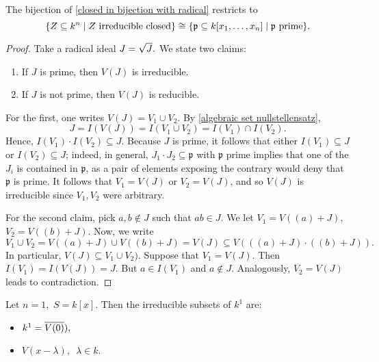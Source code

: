 \begin{prop}
  \label{prime irreducible}
  The bijection of \cref{closed in bijection with radical} restricts to
  \[\{Z \subseteq k^n \mathrel{|} \text{$Z$ irreducible closed}\} \cong \{\mathfrak p \subseteq k[x_1, \dotsc, x_n] \mathrel{|} \text{$\mathfrak p $ prime}\}.\]
\end{prop}
\begin{proof}
  Take a radical ideal \(J = \sqrt{J}.\) We state two claims:
  \begin{enumerate}
  \item If \(J\) is prime, then \(V(J)\) is irreducible.
  \item If \(J\) is not prime, then \(V(J)\) is reducible.
  \end{enumerate}
  For the first, one writes \(V(J) = V_1 \cup V_2.\) By \cref{algebraic set nullstellensatz},
  \[J = I(V(J)) = I(V_1 \cup V_2) = I(V_1) \cap I(V_2).\]
  Hence,
  \(I(V_1) \cdot I(V_2) \subseteq J.\)
  Because \(J\) is prime, it follows that either \(I(V_1) \subseteq J\) or \(I(V_2) \subseteq J\); indeed, in general, \(J_1 \cdot J_2 \subseteq \mathfrak p\) with \(\mathfrak p\) prime implies that one of the \(J_i\) is contained in \(\mathfrak p\), as a pair of elements exposing the contrary would deny that \(\mathfrak p\) is prime.
  It follows that \(V_1 = V(J)\) or \(V_2 = V(J)\), and so \(V(J)\) is irreducible since \(V_1, V_2\) were arbitrary.

  For the second claim, pick \(a, b \notin J\) such that \(ab \in J\). We let
  \(V_1 = V((a) + J),\)
  \(V_2 = V((b) + J).\)
  Now, we write
  \[V_1 \cup V_2 = V((a) + J) \cup V((b) + J) = V(J) \subseteq V(((a) + J) \cdot ((b) + J)).\]
  In particular,
  \(V(J) \subseteq V_1 \cup V_2).\)
  Suppose that
  \(V_1 = V(J).\) Then \(I(V_1) = I(V(J)) = J.\)
  But \(a \in I(V_1)\) and \(a \notin J\).
  Analogously, \(V_2 = V(J)\) leads to contradiction.
\end{proof}

\begin{example}
  Let \(n = 1,\) \(S = k[x].\) Then the irreducible subsets of \(k^1\) are:
  \begin{itemize}
  \item \(k^1 = \overline{V(0)}),\)
  \item \(V(x-\lambda), \enspace \lambda \in k.\)
  \end{itemize}
\end{example}

